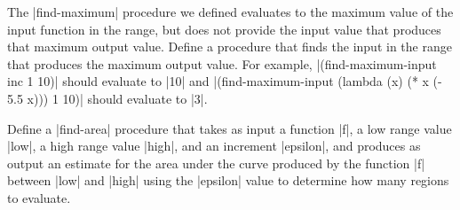 \begin{schemeregion}
\beforeex
\begin{exercise}\goldstar
The \scheme|find-maximum| procedure we defined evaluates to the maximum value of the input function in the range, but does not provide the input value that produces that maximum output value.  Define a procedure that finds the input in the range that produces the maximum output value.  For example, \scheme|(find-maximum-input inc 1 10)| should evaluate to \scheme|10| and \scheme|(find-maximum-input (lambda (x) (* x (- 5.5 x))) 1 10)| should evaluate to \scheme|3|.
\end{exercise}
\afterex

\beforeex
\begin{exercise}\goldstar
Define a \scheme|find-area| procedure that takes as input a function \scheme|f|, a low range value \scheme|low|, a high range value \scheme|high|, and an increment \scheme|epsilon|, and produces as output an estimate for the area under the curve produced by the function \scheme|f| between \scheme|low| and \scheme|high| using the \scheme|epsilon| value to determine how many regions to evaluate.
\end{exercise}
\end{schemeregion}
